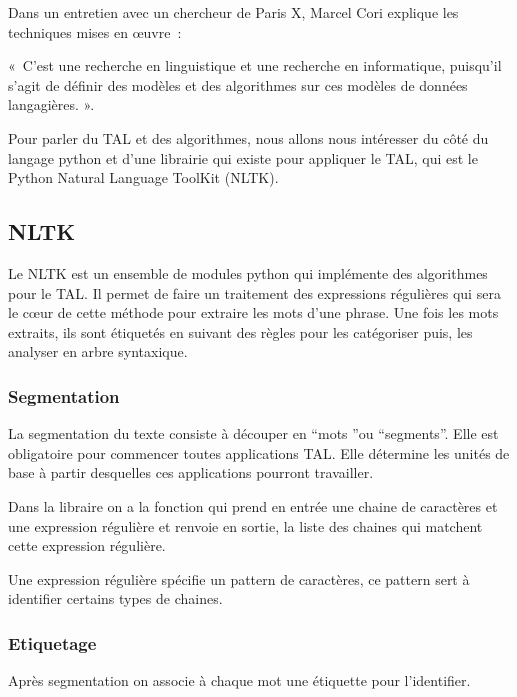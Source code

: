 	Dans un entretien avec un chercheur de Paris X, Marcel Cori explique les techniques mises en œuvre :
	\vspace{1em}
	
« C’est une recherche en linguistique et une recherche en informatique, puisqu’il s’agit de définir des modèles et des algorithmes sur ces modèles de données langagières. ». \cite{ref8}
\vspace{1em}

Pour parler du TAL et des algorithmes, nous allons nous intéresser du côté du langage python et d’une librairie qui existe pour appliquer le TAL, qui est le Python Natural Language ToolKit (NLTK).


\subsection{NLTK}

Le NLTK est un ensemble de modules python qui implémente des algorithmes pour le TAL. Il permet de faire un traitement des expressions régulières qui sera le cœur de cette méthode pour extraire les mots d’une phrase. Une fois les mots extraits, ils sont étiquetés en suivant des règles pour les catégoriser puis, les analyser en arbre syntaxique.

\subsubsection{Segmentation}

La segmentation du texte consiste à découper en “mots ”ou “segments”. Elle est obligatoire pour commencer toutes applications TAL. Elle détermine les unités de base à partir desquelles ces applications pourront travailler.
\vspace{1em}

Dans la libraire on a la fonction  qui prend en entrée une chaine de caractères et une expression régulière et renvoie en sortie, la liste des chaines qui matchent cette expression régulière.
\vspace{1em}

Une expression régulière spécifie un pattern de caractères, ce pattern sert à identifier certains types de chaines.


\subsubsection{Etiquetage}

Après segmentation on associe à chaque mot une étiquette pour l’identifier.
\vspace{1em}

